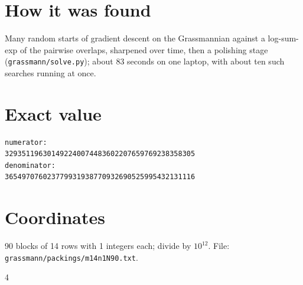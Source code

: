 \documentclass[11pt,a4paper]{article}
\begin{document}
\section{How it was found}
Many random starts of gradient descent on the Grassmannian against a log-sum-exp of the pairwise overlaps, sharpened over time, then a polishing stage (\texttt{grassmann/solve.py}); about 83 seconds on one laptop, with about ten such searches running at once.


\appendix
\section{Exact value}
{\small
\begin{verbatim}
numerator:
329351196301492240074483602207659769238358305
denominator:
365497076023779931938770932690525995432131116
\end{verbatim}}

\section{Coordinates}
90 blocks of 14 rows with 1 integers each; divide by $10^{12}$. File: \texttt{grassmann/packings/m14n1N90.txt}.
{\tiny
\begin{multicols}{4}
\end{multicols}}
\end{document}
